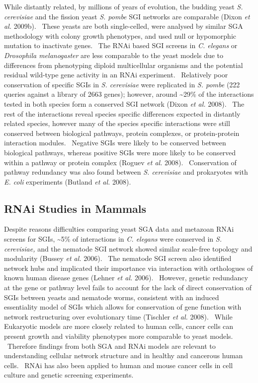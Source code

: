 While distantly related, by millions of years of evolution, the budding
yeast \textit{S. cerevisiae} and the fission yeast \textit{S. pombe}
SGI networks are comparable (Dixon\textit{ et al.} 2009b). \ These
yeasts are both single-celled, were analysed by similar SGA methodology
with colony growth phenotypes, and used null or hypomorphic mutation to
inactivate genes. \ The RNAi based SGI screens in \textit{C. elegans
}or \textit{Drosophila melanogaster} are less comparable to the yeast
models due to differences from phenotyping diploid multicellular
organisms and the potential residual wild-type gene activity in an RNAi
experiment. \ Relatively poor conservation of specific SGIs in
\textit{S. cerevisiae} were replicated in \textit{S. pombe} (222
queries against a library of 2663 genes); however, around \~{}29\% of
the interactions tested in both species form a conserved SGI network
(Dixon\textit{ et al.} 2008). \ The rest of the interactions reveal
species specific differences expected in distantly related species,
however many of the species specific interactions were still conserved
between biological pathways, protein complexes, or protein-protein
interaction modules. \ Negative SGIs were likely to be conserved
between biological pathways, whereas positive SGIs were more likely to
be conserved within a pathway or protein complex (Roguev\textit{ et
al.} 2008). \ Conservation of pathway redundancy was also found between
\textit{S. cerevisiae} and prokaryotes with \textit{E. coli}
experiments (Butland\textit{ et al.} 2008). \ 


\subsection[RNAi Studies in Mammals]{RNAi Studies in Mammals}

Despite reasons difficulties comparing yeast SGA data and metazoan RNAi
screens for SGIs, \~{}5\% of interactions in \textit{C. elegans} were
conserved in \textit{S. cerevisiae,} and the nematode SGI network
showed similar scale-free topology and modularity (Bussey\textit{ et
al.} 2006). \ The nematode SGI screen also identified network hubs and
implicated their importance via interaction with orthologues of known
human disease genes (Lehner\textit{ et al.} 2006). \ However, genetic
redundancy at the gene or pathway level fails to account for the lack
of direct conservation of SGIs between yeasts and nematode worms,
consistent with an induced essentiality model of SGIs which allows for
conservation of gene function with network restructuring over
evolutionary time (Tischler\textit{ et al.} 2008). \ While Eukaryotic
models are more closely related to human cells, cancer cells can
present growth and viability phenotypes more comparable to yeast
models. \ Therefore findings from both SGA and RNAi models are relevant
to understanding cellular network structure and in healthy and
cancerous human cells. \ RNAi has also been applied to human and mouse
cancer cells in cell culture and genetic screening experiments. \ 


